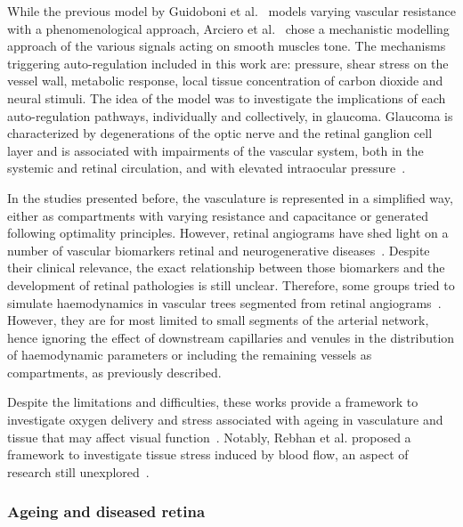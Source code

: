 \documentclass[12pt,a4paper]{journal}
\begin{document}
While the previous model by Guidoboni et al.~\cite{Guidoboni_2014} models varying vascular resistance with a phenomenological approach, Arciero et al.~\cite{Arciero_2013} chose a mechanistic modelling approach of the various signals acting on smooth muscles tone.
The mechanisms triggering auto-regulation included in this work are: pressure, shear stress on the vessel wall, metabolic response, local tissue concentration of carbon dioxide and neural stimuli.
The idea of the model was to investigate the implications of each auto-regulation pathways, individually and collectively, in glaucoma.
Glaucoma is characterized by degenerations of the optic nerve and the retinal ganglion cell layer and is associated with impairments of the vascular system, both in the systemic and retinal circulation, and with elevated intraocular pressure~\cite{Bonomi_2000, Hulsman_2007}.

In the studies presented before, the vasculature is represented in a simplified way, either as compartments with varying resistance and capacitance or generated following optimality principles.
However, retinal angiograms have shed light on a number of vascular biomarkers retinal and neurogenerative diseases~\cite{Chalam_2016,Tsokolas_2020}.
Despite their clinical relevance, the exact relationship between those biomarkers and the development of retinal pathologies is still unclear.
Therefore, some groups tried to simulate haemodynamics in vascular trees segmented from retinal angiograms~\cite{Aletti_2016, Liu_2009, Malek_2015, Rebhan_2019}.
However, they are for most limited to small segments of the arterial network, hence ignoring the effect of downstream capillaries and venules in the distribution of haemodynamic parameters or including the remaining vessels as compartments, as previously described.

Despite the limitations and difficulties, these works provide a framework to investigate oxygen delivery and stress associated with ageing in vasculature and tissue that may affect visual function~\cite{Rickett_2010,Sim_2013,Wessel_2012}.
Notably, Rebhan et al. proposed a framework to investigate tissue stress induced by blood flow, an aspect of research still unexplored~\cite{Rebhan_2019}.

\break

\subsubsection{Ageing and diseased retina}
\end{document}
